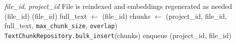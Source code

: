 \begin{algorithm}[H]
\caption{ReprocessFileAndIncrementalUpdate}
\small\begin{algorithmic}[1]
\Require \textit{file\_id}, \textit{project\_id}
\Ensure File is reindexed and embeddings regenerated as needed
\State \texttt{}(file\_id)
\State \texttt{}(file\_id)
\State full\_text $\leftarrow$ \texttt{}(file\_id)
\State chunks $\leftarrow$ \texttt{}(project\_id, file\_id,
\Statex \hspace{2em} full\_text, \texttt{max\_chunk\_size}, \texttt{overlap})
\State \texttt{TextChunkRepository.bulk\_insert}(chunks)
\State enqueue \texttt{}(project\_id, file\_id)
\end{algorithmic}\normalsize
\end{algorithm}
\FloatBarrier

